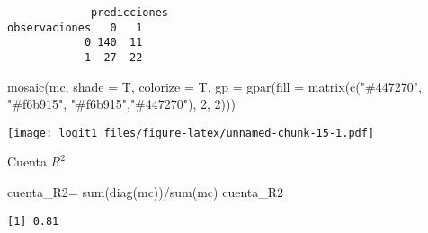 \documentclass[
]{article}
\newenvironment{Shaded}{\begin{snugshade}}{\end{snugshade}}
\newcommand{\AttributeTok}[1]{\textcolor[rgb]{0.77,0.63,0.00}{#1}}
\newcommand{\DecValTok}[1]{\textcolor[rgb]{0.00,0.00,0.81}{#1}}
\newcommand{\FloatTok}[1]{\textcolor[rgb]{0.00,0.00,0.81}{#1}}
\newcommand{\FunctionTok}[1]{\textcolor[rgb]{0.00,0.00,0.00}{#1}}
\newcommand{\NormalTok}[1]{#1}
\newcommand{\OtherTok}[1]{\textcolor[rgb]{0.56,0.35,0.01}{#1}}
\newcommand{\SpecialCharTok}[1]{\textcolor[rgb]{0.00,0.00,0.00}{#1}}
\newcommand{\StringTok}[1]{\textcolor[rgb]{0.31,0.60,0.02}{#1}}
\begin{document}
\begin{Shaded}
\end{Shaded}

\begin{verbatim}
             predicciones
observaciones   0   1
            0 140  11
            1  27  22
\end{verbatim}

\begin{Shaded}
\begin{Highlighting}[]
\FunctionTok{mosaic}\NormalTok{(mc, }\AttributeTok{shade =}\NormalTok{ T, }\AttributeTok{colorize =}\NormalTok{ T,}
       \AttributeTok{gp =} \FunctionTok{gpar}\NormalTok{(}\AttributeTok{fill =} \FunctionTok{matrix}\NormalTok{(}\FunctionTok{c}\NormalTok{(}\StringTok{"\#447270"}\NormalTok{, }\StringTok{"\#f6b915"}\NormalTok{, }\StringTok{"\#f6b915"}\NormalTok{,}\StringTok{"\#447270"}\NormalTok{), }\DecValTok{2}\NormalTok{, }\DecValTok{2}\NormalTok{)))}
\end{Highlighting}
\end{Shaded}

\texttt{[image: logit1\_files/figure-latex/unnamed-chunk-15-1.pdf]}

Cuenta \(R^{2}\)

\begin{Shaded}
\begin{Highlighting}[]
\NormalTok{cuenta\_R2}\OtherTok{=} \FunctionTok{sum}\NormalTok{(}\FunctionTok{diag}\NormalTok{(mc))}\SpecialCharTok{/}\FunctionTok{sum}\NormalTok{(mc)}
\NormalTok{cuenta\_R2}
\end{Highlighting}
\end{Shaded}

\begin{verbatim}
[1] 0.81
\end{verbatim}
\end{document}
